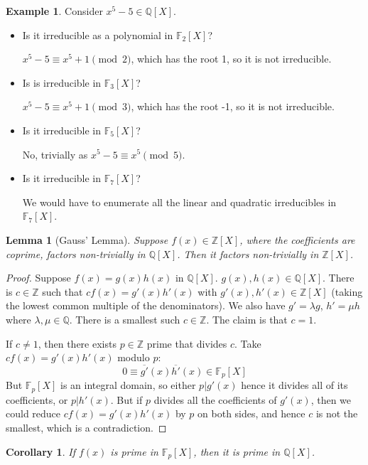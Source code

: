 \documentclass{article}
\theoremstyle{definition}
\newtheorem{exmp}{Example}[section]
\theoremstyle{plain}%
\newtheorem{lem}[thm]{Lemma}
\newtheorem*{cor}{Corollary}
\theoremstyle{remark}
\newcommand{\Q}{\mathbb{Q}}
\newcommand{\Z}{\mathbb{Z}}
\newcommand{\F}{\mathbb{F}}
\begin{document}
\begin{exmp}
    Consider $x^5 - 5 \in \Q[X]$.
    \begin{itemize}
        \item Is it irreducible as a polynomial in $\F_2[X]$?
        
        $x^5 - 5 \equiv x^5 + 1 \pmod 2$, which has the root 1, so it is not irreducible.
        \item Is is irreducible in $\F_3[X]$?
        
        $x^5 - 5 \equiv x^5 + 1 \pmod 3$, which has the root -1, so it is not irreducible.
        \item Is it irreducible in $\F_5[X]$?
        
        No, trivially as $x^5-5 \equiv x^5 \pmod 5$.
        \item Is it irreducible in $\F_7[X]$?
        
        We would have to enumerate all the linear and quadratic irreducibles in $\F_7[X]$.
    \end{itemize}
\end{exmp}

\begin{lem}[Gauss' Lemma]
    Suppose $f(x) \in \Z[X]$, where the coefficients are coprime, factors non-trivially in $\Q[X]$. Then it factors non-trivially in $\Z[X]$.
\end{lem}

\begin{proof}
    Suppose $f(x) = g(x) h(x)$ in $\Q[X]$. $g(x), h(x) \in \Q[X]$. There is $c \in \Z$ such that $cf(x) = g'(x)h'(x)$ with $g'(x), h'(x) \in \Z[X]$ (taking the lowest common multiple of the denominators). We also have $g' = \lambda g$, $h' = \mu h$ where $\lambda, \mu \in \Q$. There is a smallest such $c \in \Z$. The claim is that $c = 1$.
    
    If $c \ne 1$, then there exists $p \in \Z$ prime that divides $c$. Take $cf(x) = g'(x) h' (x)$ modulo $p$:
    \[0 \equiv \overline{g'}(x) \overline{h'}(x) \in \F_p[X]\]
    But $\F_p[X]$ is an integral domain, so either $p | g'(x)$ hence it divides all of its coefficients, or $p | h'(x)$. But if $p$ divides all the coefficients of $g'(x)$, then we could reduce $cf(x) = g'(x)h'(x)$ by $p$ on both sides, and hence $c$ is not the smallest, which is a contradiction.
\end{proof}

\begin{cor}
    If $f(x)$ is prime in $\F_p[X]$, then it is prime in $\Q[X]$.
\end{cor}
\end{document}
